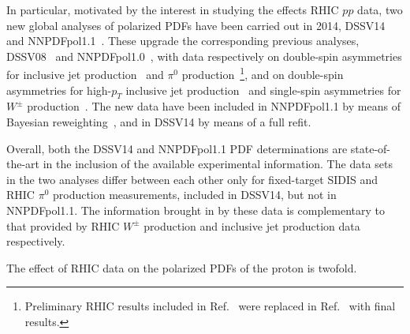 In particular, motivated by the interest in studying the effects RHIC $pp$ 
data, two new global analyses of polarized PDFs have been carried out in
2014, DSSV14~\cite{deFlorian:2014yva} and NNPDFpol1.1~\cite{Nocera:2014gqa}.
%
These upgrade the corresponding previous analyses, 
DSSV08~\cite{deFlorian:2008mr} and 
NNPDFpol1.0~\cite{Ball:2013lla}, with data respectively on double-spin 
asymmetries for inclusive jet production~\cite{Adamczyk:2014ozi} 
and $\pi^0$ production~\cite{Adare:2014hsq}\footnote{Preliminary RHIC results 
included in Ref.~\cite{deFlorian:2008mr} were replaced in
Ref.~\cite{deFlorian:2014yva} with final results.}, 
and on double-spin asymmetries for high-$p_T$ inclusive jet 
production~\cite{Adamczyk:2014ozi,Adamczyk:2012qj,Adare:2010cc} and single-spin
asymmetries for $W^\pm$ production~\cite{Adamczyk:2014xyw}.
%
The new data have been included in NNPDFpol1.1 
by means of Bayesian reweighting~\cite{Ball:2010gb},
and in DSSV14 by means of a full refit.  

Overall, both the DSSV14 and NNPDFpol1.1 PDF determinations are 
state-of-the-art in the inclusion of the available experimental information. 
%
The data sets in the two analyses differ between each other only for 
fixed-target SIDIS and RHIC $\pi^0$ production measurements, included in 
DSSV14, but not in NNPDFpol1.1. 
%
The information brought in by these data is complementary to that provided by 
RHIC $W^\pm$ production and inclusive jet production data respectively. 

The effect of RHIC data on the polarized PDFs of the proton is twofold. 
 
